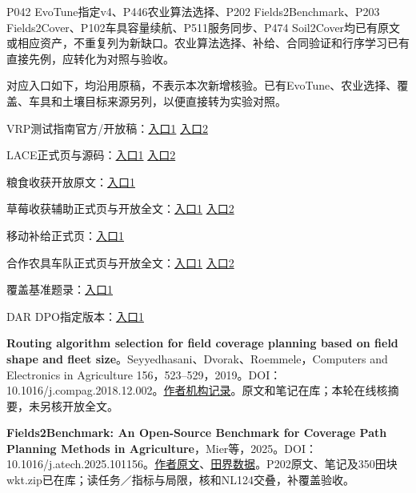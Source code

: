 \documentclass[11pt,a4paper]{article}
\newcommand{\bodytext}[1]{#1\par}
\newcommand{\sourcetext}[1]{{\fontsize{9.2}{14}\selectfont\color{Muted}#1\par}}
\begin{document}
\endgroup
\bodytext{P042 EvoTune指定v4、P446农业算法选择、P202 Fields2Benchmark、P203 Fields2Cover、P102车具容量续航、P511服务同步、P474 Soil2Cover均已有原文或相应资产，不重复列为新缺口。农业算法选择、补给、合同验证和行序学习已有直接先例，应转化为对照与验收。}
\bodytext{对应入口如下，均沿用原稿，不表示本次新增核验。已有EvoTune、农业选择、覆盖、车具和土壤目标来源另列，以便直接转为实验对照。}
\sourcetext{VRP测试指南官方/\allowbreak{}开放稿：\href{https://publications.polymtl.ca/50935/}{入口1} \href{https://arxiv.org/abs/2109.13983}{入口2}}
\sourcetext{LACE正式页与源码：\href{https://www.nature.com/articles/s42256-026-01307-8}{入口1} \href{https://github.com/PJ-NTU/LACE}{入口2}}
\sourcetext{粮食收获开放原文：\href{https://www.mdpi.com/2073-4395/12/5/1151}{入口1}}
\sourcetext{草莓收获辅助正式页与开放全文：\href{https://onlinelibrary.wiley.com/doi/full/10.1002/rob.22106}{入口1} \href{https://s.gifford.ucdavis.edu/uploads/pub/2023/03/10/vougioukasrobots.pdf}{入口2}}
\sourcetext{移动补给正式页：\href{https://www.sciencedirect.com/science/article/pii/S0305054823003180}{入口1}}
\sourcetext{合作农具车队正式页与开放全文：\href{https://www.sciencedirect.com/science/article/pii/S0305054825002813}{入口1} \href{https://burjcdigital.urjc.es/bitstreams/eab902dd-2b44-4f09-acc9-6507f194b8ec/download}{入口2}}
\sourcetext{覆盖基准题录：\href{https://pure.au.dk/portal/en/publications/method-and-bench-marking-framework-for-coverage-path-planning-in-/}{入口1}}
\sourcetext{DAR DPO指定版本：\href{https://arxiv.org/abs/2507.10614v2}{入口1}}
\sourcetext{\textbf{Routing algorithm selection for field coverage planning based on field shape and fleet size}。Seyyedhasani、Dvorak、Roemmele，Computers and Electronics in Agriculture 156，523–529，2019。DOI：10.1016/\allowbreak{}j.compag.2018.12.002。\href{https://scholars.uky.edu/en/publications/routing-algorithm-selection-for-field-coverage-planning-based-on-/}{作者机构记录}。原文和笔记在库；本轮在线核摘要，未另核开放全文。}
\sourcetext{\textbf{Fields2Benchmark: An Open-Source Benchmark for Coverage Path Planning Methods in Agriculture}，Mier等，2025。DOI：10.1016/\allowbreak{}j.atech.2025.101156。\href{https://edepot.wur.nl/698168}{作者原文}、\href{https://zenodo.org/records/14524735}{田界数据}。P202原文、笔记及350田块wkt.zip已在库；读任务／指标与局限，核和NL124交叠，补覆盖验收。}
\end{document}
